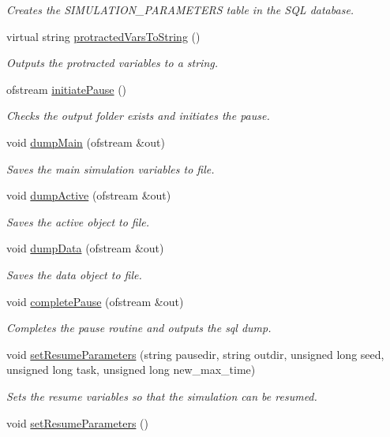 \begin{DoxyCompactItemize}
\begin{DoxyCompactList}\small\item\em Creates the S\+I\+M\+U\+L\+A\+T\+I\+O\+N\+\_\+\+P\+A\+R\+A\+M\+E\+T\+E\+RS table in the S\+QL database. \end{DoxyCompactList}\item 
virtual string \hyperlink{class_tree_aa8bb5d93c7992404ede0a49bb69ccd1f}{protracted\+Vars\+To\+String} ()
\begin{DoxyCompactList}\small\item\em Outputs the protracted variables to a string. \end{DoxyCompactList}\item 
ofstream \hyperlink{class_tree_a768b9c46fbbc1e49257ab96a66491058}{initiate\+Pause} ()
\begin{DoxyCompactList}\small\item\em Checks the output folder exists and initiates the pause. \end{DoxyCompactList}\item 
void \hyperlink{class_tree_a687613834d41ec340fc6f62708368f84}{dump\+Main} (ofstream \&out)
\begin{DoxyCompactList}\small\item\em Saves the main simulation variables to file. \end{DoxyCompactList}\item 
void \hyperlink{class_tree_a3cb2d92afc1943796ad6663cc97fc07d}{dump\+Active} (ofstream \&out)
\begin{DoxyCompactList}\small\item\em Saves the active object to file. \end{DoxyCompactList}\item 
void \hyperlink{class_tree_af94976f439abe0a141a4ab56fac91627}{dump\+Data} (ofstream \&out)
\begin{DoxyCompactList}\small\item\em Saves the data object to file. \end{DoxyCompactList}\item 
void \hyperlink{class_tree_a9339bf7bfb7ae81ab78d47a328bc5ad0}{complete\+Pause} (ofstream \&out)
\begin{DoxyCompactList}\small\item\em Completes the pause routine and outputs the sql dump. \end{DoxyCompactList}\item 
void \hyperlink{class_tree_ac545d844141db977920fc9fd76ce9dbb}{set\+Resume\+Parameters} (string pausedir, string outdir, unsigned long seed, unsigned long task, unsigned long new\+\_\+max\+\_\+time)
\begin{DoxyCompactList}\small\item\em Sets the resume variables so that the simulation can be resumed. \end{DoxyCompactList}\item 
void \hyperlink{class_tree_aeade4bccb8394937a53bc4fbcf2b4300}{set\+Resume\+Parameters} ()\hypertarget{class_tree_aeade4bccb8394937a53bc4fbcf2b4300}{}\label{class_tree_aeade4bccb8394937a53bc4fbcf2b4300}


\end{DoxyCompactItemize}
